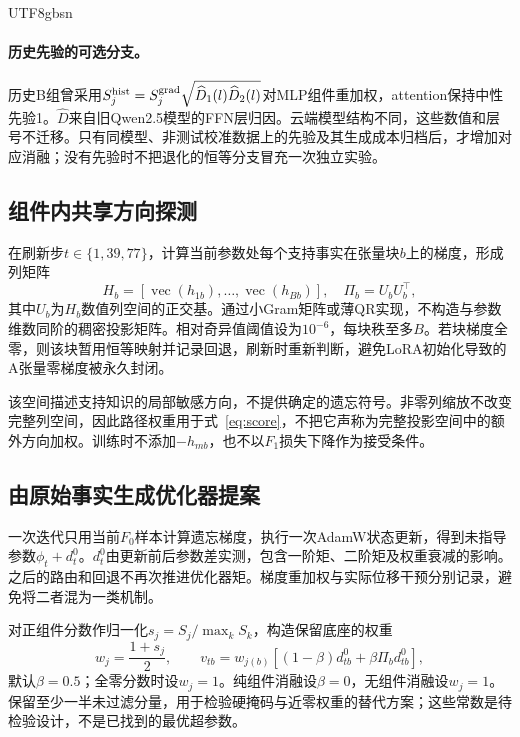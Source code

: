 \documentclass[sigconf,anonymous,review]{acmart}
\begin{document}
\begin{CJK*}{UTF8}{gbsn}
\paragraph{历史先验的可选分支。}
历史B组曾采用$S_j^{\rm hist}=S_j^{\rm grad}\sqrt{\widehat D_1(l)\widehat D_2(l)}$对MLP组件重加权，attention保持中性先验1。$\widehat D$来自旧Qwen2.5模型的FFN层归因。云端模型结构不同，这些数值和层号不迁移。只有同模型、非测试校准数据上的先验及其生成成本归档后，才增加对应消融；没有先验时不把退化的恒等分支冒充一次独立实验。

\subsection{组件内共享方向探测}
在刷新步$t\in\{1,39,77\}$，计算当前参数处每个支持事实在张量块$b$上的梯度，形成列矩阵
\begin{equation}
 H_b=[\operatorname{vec}(h_{1b}),\ldots,
 \operatorname{vec}(h_{Bb})],\quad
 \Pi_b=U_bU_b^\top,
 \label{eq:span}
\end{equation}
其中$U_b$为$H_b$数值列空间的正交基。通过小Gram矩阵或薄QR实现，不构造与参数维数同阶的稠密投影矩阵。相对奇异值阈值设为$10^{-6}$，每块秩至多$B$。若块梯度全零，则该块暂用恒等映射并记录回退，刷新时重新判断，避免LoRA初始化导致的A张量零梯度被永久封闭。

该空间描述支持知识的局部敏感方向，不提供确定的遗忘符号。非零列缩放不改变完整列空间，因此路径权重用于式~\eqref{eq:score}，不把它声称为完整投影空间中的额外方向加权。训练时不添加$-h_{mb}$，也不以$F_1$损失下降作为接受条件。

\subsection{由原始事实生成优化器提案}
一次迭代只用当前$F_0$样本计算遗忘梯度，执行一次AdamW状态更新，得到未指导参数$\phi_t+d_t^0$。$d_t^0$由更新前后参数差实测，包含一阶矩、二阶矩及权重衰减的影响。之后的路由和回退不再次推进优化器矩。梯度重加权与实际位移干预分别记录，避免将二者混为一类机制。

对正组件分数作归一化$s_j=S_j/\max_kS_k$，构造保留底座的权重
\begin{equation}
 w_j=\frac{1+s_j}{2},\qquad
 v_{tb}=w_{j(b)}\left[(1-\beta)d_{tb}^0+
                  \beta\Pi_b d_{tb}^0\right],
 \label{eq:route}
\end{equation}
默认$\beta=0.5$；全零分数时设$w_j=1$。纯组件消融设$\beta=0$，无组件消融设$w_j=1$。保留至少一半未过滤分量，用于检验硬掩码与近零权重的替代方案；这些常数是待检验设计，不是已找到的最优超参数。


\end{CJK*}
\end{document}
